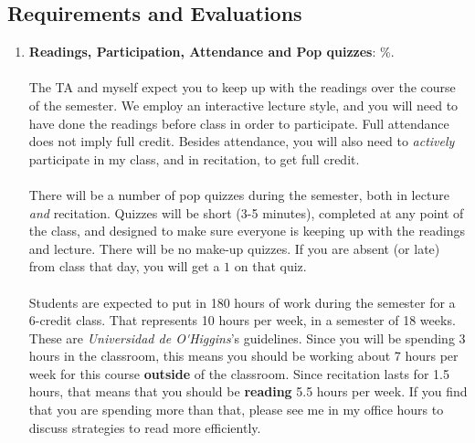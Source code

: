 \documentclass[letterpaper]{article}
\begin{document}
\subsection*{Requirements and Evaluations}

\begin{enumerate}

	\item {\bf Readings, Participation, Attendance and Pop quizzes}: {\unskip}\%.
	\\
	\\
	The TA and myself expect you to keep up with the readings over the course of the semester. We employ an interactive lecture style, and you will need to have done the readings before class in order to participate. Full attendance does not imply full credit. Besides attendance, you will also need to \emph{actively} participate in my class, and in recitation, to get full credit.
\\
\\	
	There will be a number of pop quizzes during the semester, both in lecture \emph{and} recitation. Quizzes will be short (3-5 minutes), completed at any point of the class, and designed to make sure everyone is keeping up with the readings and lecture. There will be no make-up quizzes. If you are absent (or late) from class that day, you will get a $1$ on that quiz. 
	\\
	\\
	Students are expected to put in 180 hours of work during the semester for a 6-credit class. That represents 10 hours per week, in a semester of 18 weeks. These are \emph{Universidad de O\'\unskip Higgins}'s guidelines. Since you will be spending 3 hours in the classroom, this means you should be working about 7 hours per week for this course {\bf outside} of the classroom. Since recitation lasts for 1.5 hours, that means that you should be {\bf reading} 5.5 hours per week. If you find that you are spending more than that, please see me in my office hours to discuss strategies to read more efficiently. 



\end{enumerate}
\end{document}
